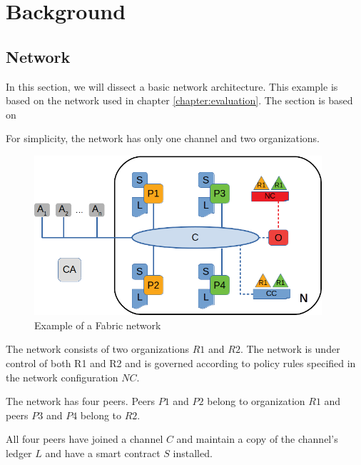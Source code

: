 \chapter{Background}
\label{chapter:background}

\section{Network}
\label{sec:network}

In this section, we will dissect a basic network architecture. This example is based on the network used in chapter \ref{chapter:evaluation}. The section is based on \cite{fabricdocs:network}

For simplicity, the network has only one channel and two organizations.

\vskip 0.5cm

\begin{figure}[hp]
\begin{center}
\includegraphics[width=0.95\textwidth]{figures/network}
\end{center}
\caption{Example of a Fabric network}
\label{fig:net}
\end{figure}


The network consists of two organizations $R1$ and $R2$. The network is under control of both R1 and R2 and is governed according to policy rules specified in the network configuration $NC$.

The network has four peers. Peers $P1$ and $P2$ belong to organization $R1$ and peers $P3$ and $P4$ belong to $R2$.

All four peers have joined a channel $C$ and maintain a copy of the channel's ledger $L$ and have a smart contract $S$ installed.


